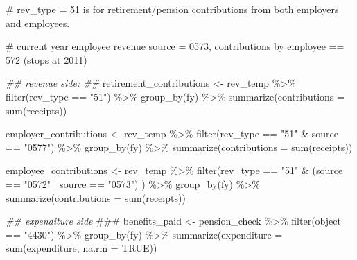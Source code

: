 \documentclass[
  letterpaper,
  DIV=11,
  numbers=noendperiod]{scrreport}
\newenvironment{Shaded}{\begin{snugshade}}{\end{snugshade}}
\newcommand{\AlertTok}[1]{\textcolor[rgb]{0.68,0.00,0.00}{#1}}
\newcommand{\AttributeTok}[1]{\textcolor[rgb]{0.40,0.45,0.13}{#1}}
\newcommand{\CommentTok}[1]{\textcolor[rgb]{0.37,0.37,0.37}{#1}}
\newcommand{\ConstantTok}[1]{\textcolor[rgb]{0.56,0.35,0.01}{#1}}
\newcommand{\DocumentationTok}[1]{\textcolor[rgb]{0.37,0.37,0.37}{\textit{#1}}}
\newcommand{\FunctionTok}[1]{\textcolor[rgb]{0.28,0.35,0.67}{#1}}
\newcommand{\NormalTok}[1]{\textcolor[rgb]{0.00,0.23,0.31}{#1}}
\newcommand{\OtherTok}[1]{\textcolor[rgb]{0.00,0.23,0.31}{#1}}
\newcommand{\SpecialCharTok}[1]{\textcolor[rgb]{0.37,0.37,0.37}{#1}}
\newcommand{\StringTok}[1]{\textcolor[rgb]{0.13,0.47,0.30}{#1}}
\begin{document}
\begin{Shaded}
\begin{Highlighting}[]
\CommentTok{\# rev\_type = 51 is for retirement/pension contributions from both employers and employees.}

\CommentTok{\# current year employee revenue source = 0573, contributions by employee == 572 (stops at 2011)}

\DocumentationTok{\#\# revenue side: \#\#}
\NormalTok{retirement\_contributions }\OtherTok{\textless{}{-}}\NormalTok{ rev\_temp }\SpecialCharTok{\%\textgreater{}\%} 
  \FunctionTok{filter}\NormalTok{(rev\_type }\SpecialCharTok{==} \StringTok{"51"}\NormalTok{) }\SpecialCharTok{\%\textgreater{}\%} \FunctionTok{group\_by}\NormalTok{(fy) }\SpecialCharTok{\%\textgreater{}\%} \FunctionTok{summarize}\NormalTok{(}\AttributeTok{contributions =} \FunctionTok{sum}\NormalTok{(receipts))}

\NormalTok{employer\_contributions }\OtherTok{\textless{}{-}}\NormalTok{ rev\_temp }\SpecialCharTok{\%\textgreater{}\%} 
  \FunctionTok{filter}\NormalTok{(rev\_type }\SpecialCharTok{==} \StringTok{"51"} \SpecialCharTok{\&}\NormalTok{ source }\SpecialCharTok{==} \StringTok{"0577"}\NormalTok{) }\SpecialCharTok{\%\textgreater{}\%} \FunctionTok{group\_by}\NormalTok{(fy) }\SpecialCharTok{\%\textgreater{}\%} \FunctionTok{summarize}\NormalTok{(}\AttributeTok{contributions =} \FunctionTok{sum}\NormalTok{(receipts))}

\NormalTok{employee\_contributions }\OtherTok{\textless{}{-}}\NormalTok{ rev\_temp }\SpecialCharTok{\%\textgreater{}\%} 
  \FunctionTok{filter}\NormalTok{(rev\_type }\SpecialCharTok{==} \StringTok{"51"} \SpecialCharTok{\&}\NormalTok{ (source }\SpecialCharTok{==} \StringTok{"0572"} \SpecialCharTok{|}\NormalTok{ source }\SpecialCharTok{==} \StringTok{"0573"}\NormalTok{) ) }\SpecialCharTok{\%\textgreater{}\%} 
  \FunctionTok{group\_by}\NormalTok{(fy) }\SpecialCharTok{\%\textgreater{}\%} \FunctionTok{summarize}\NormalTok{(}\AttributeTok{contributions =} \FunctionTok{sum}\NormalTok{(receipts))}


\DocumentationTok{\#\# expenditure side }\AlertTok{\#\#\#}\DocumentationTok{ }
\NormalTok{benefits\_paid }\OtherTok{\textless{}{-}}\NormalTok{ pension\_check }\SpecialCharTok{\%\textgreater{}\%} \FunctionTok{filter}\NormalTok{(object }\SpecialCharTok{==} \StringTok{"4430"}\NormalTok{) }\SpecialCharTok{\%\textgreater{}\%}
  \FunctionTok{group\_by}\NormalTok{(fy) }\SpecialCharTok{\%\textgreater{}\%} 
  \FunctionTok{summarize}\NormalTok{(}\AttributeTok{expenditure =} \FunctionTok{sum}\NormalTok{(expenditure, }\AttributeTok{na.rm =} \ConstantTok{TRUE}\NormalTok{))}


\end{Highlighting}
\end{Shaded}
\end{document}
